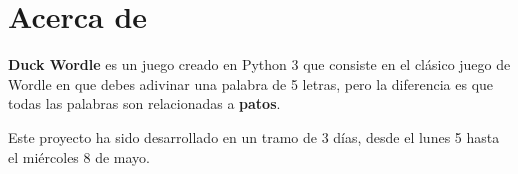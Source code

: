 \section{Acerca de}
\textbf{Duck Wordle} es un juego creado en Python 3 que consiste en el clásico juego de Wordle en que debes adivinar una palabra de 5 letras, pero la diferencia es que todas las palabras son relacionadas a \textbf{patos}.
\par
\noindent Este proyecto ha sido desarrollado en un tramo de 3 días, desde el lunes 5 hasta el miércoles 8 de mayo.